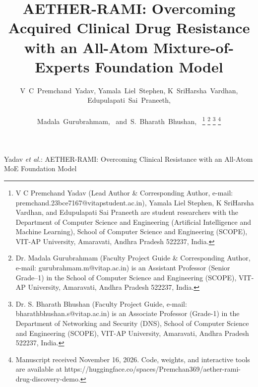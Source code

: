 \title{AETHER-RAMI: Overcoming Acquired Clinical Drug Resistance with an All-Atom Mixture-of-Experts Foundation Model}

\author{V~C~Premchand~Yadav,
        Yamala~Liel~Stephen,
        K~SriHarsha~Vardhan,
        Edupulapati~Sai~Praneeth,\\
        \\
        Madala~Gurubrahmam,~
        and~S.~Bharath~Bhushan,~%
\thanks{V C Premchand Yadav (Lead Author \& Corresponding Author, e-mail: premchand.23bce7167@vitapstudent.ac.in), Yamala Liel Stephen, K SriHarsha Vardhan, and Edupulapati Sai Praneeth are student researchers with the Department of Computer Science and Engineering (Artificial Intelligence and Machine Learning), School of Computer Science and Engineering (SCOPE), VIT-AP University, Amaravati, Andhra Pradesh 522237, India.}%
\thanks{Dr. Madala Gurubrahmam (Faculty Project Guide \& Corresponding Author, e-mail: gurubrahmam.m@vitap.ac.in) is an Assistant Professor (Senior Grade--1) in the School of Computer Science and Engineering (SCOPE), VIT-AP University, Amaravati, Andhra Pradesh 522237, India.}%
\thanks{Dr. S. Bharath Bhushan (Faculty Project Guide, e-mail: bharathbhushan.s@vitap.ac.in) is an Associate Professor (Grade-1) in the Department of Networking and Security (DNS), School of Computer Science and Engineering (SCOPE), VIT-AP University, Amaravati, Andhra Pradesh 522237, India.}%
\thanks{Manuscript received November 16, 2026. Code, weights, and interactive tools are available at https://huggingface.co/spaces/Premchan369/aether-rami-drug-discovery-demo.}}

%
{Yadav \MakeLowercase{\textit{et al.}}: AETHER-RAMI: Overcoming Clinical Resistance with an All-Atom MoE Foundation Model}

